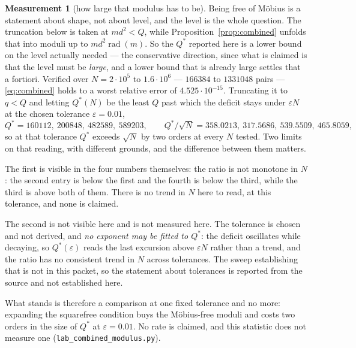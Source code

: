 \documentclass[11pt,a4paper]{article}
\theoremstyle{plain}
\theoremstyle{definition}
\newtheorem{measurement}[theorem]{Measurement}
\theoremstyle{remark}
\DeclareMathOperator{\rad}{rad}
\begin{document}
\begin{measurement}[how large that modulus has to be]\label{meas:combmod}
Being free of M\"obius is a statement about shape, not about level,
and the level is the whole question. The truncation below is taken at
$md^2<Q$, while Proposition~\ref{prop:combined} unfolds that into
moduli up to $md^2\rad(m)$. So the $Q^*$ reported here is a lower bound
on the level actually needed --- the conservative direction, since what
is claimed is that the level must be \emph{large}, and a lower bound
that is already large settles that a fortiori. Verified
over $N=2\cdot10^5$ to $1.6\cdot10^6$ --- $166384$ to $1331048$ pairs
--- \eqref{eq:combined} holds to a worst relative error of
$4.525\cdot10^{-15}$. Truncating it to $q<Q$ and letting $Q^*(N)$ be
the least $Q$ past which the deficit stays under $\varepsilon N$ at the
chosen tolerance $\varepsilon=0.01$,
\[
  Q^*=160112,\ 200848,\ 482589,\ 589203,
  \qquad
  Q^*/\sqrt N=358.0213,\ 317.5686,\ 539.5509,\ 465.8059,
\]
so at that tolerance $Q^*$ exceeds $\sqrt N$ by two orders at every $N$
tested. Two limits on that reading, with different grounds, and the
difference between them matters.

The first is visible in the four numbers themselves: the ratio is not
monotone in $N$: the second entry is below the first and the fourth is
below the third, while the third is above both of them. There is no
trend in $N$ here to read, at this tolerance, and none is claimed.

The second is not visible here and is not measured here. The tolerance
is chosen and not derived, and \emph{no exponent may be fitted to
$Q^*$}: the deficit oscillates while decaying, so $Q^*(\varepsilon)$
reads the last excursion above $\varepsilon N$ rather than a trend, and
the ratio has no consistent trend in $N$ across tolerances. The sweep
establishing that is not in this packet, so the statement about
tolerances is reported from the source and not established here.

What stands is therefore a comparison at one fixed tolerance and no
more: expanding the squarefree condition buys the M\"obius-free moduli and
costs two orders in the size of $Q^*$ at $\varepsilon=0.01$. No rate is
claimed, and this statistic does not measure one
(\texttt{lab\_combined\_modulus.py}).
\end{measurement}
\end{document}
